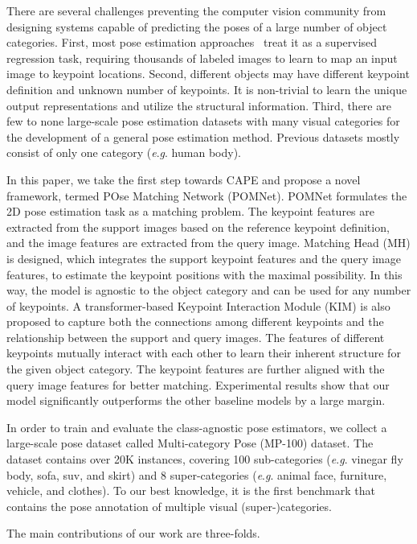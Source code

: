 \documentclass[runningheads]{llncs}
\newcommand{\eg}{\textit{e}.\textit{g}. }
\begin{document}
There are several challenges preventing the computer vision community from designing systems capable of predicting the poses of a large number of object categories. 
First, most pose estimation approaches~\cite{sun2019deep} treat it as a supervised regression task, requiring thousands of labeled images to learn to map an input image to keypoint locations. 
Second, different objects may have different keypoint definition and unknown number of keypoints. It is non-trivial to learn the unique output representations and utilize the structural information.
Third, there are few to none large-scale pose estimation datasets with many visual categories for the development of a general pose estimation method. Previous datasets mostly consist of only one category (\eg human body).

In this paper, we take the first step towards CAPE and propose a novel framework, termed POse Matching Network (POMNet). POMNet formulates the 2D pose estimation task as a matching problem. The keypoint features are extracted from the support images based on the reference keypoint definition, and the image features are extracted from the query image. Matching Head (MH) is designed, which integrates the support keypoint features and the query image features, to estimate the keypoint positions with the maximal possibility. In this way, the model is agnostic to the object category and can be used for any number of keypoints. A transformer-based Keypoint Interaction Module (KIM) is also proposed to capture both the connections among different keypoints and the relationship between the support and query images. The features of different keypoints mutually interact with each other to learn their inherent structure for the given object category. The keypoint features are further aligned with the query image features for better matching. Experimental results show that our model significantly outperforms the other baseline models by a large margin.

In order to train and evaluate the class-agnostic pose estimators, we collect a large-scale pose dataset called Multi-category Pose (MP-100) dataset. The dataset contains over 20K instances, covering 100 sub-categories (\eg vinegar fly body, sofa, suv, and skirt) and 8 super-categories (\eg animal face, furniture, vehicle, and clothes). To our best knowledge, it is the first benchmark that contains the pose annotation of multiple visual (super-)categories.

The main contributions of our work are three-folds. 
\end{document}
